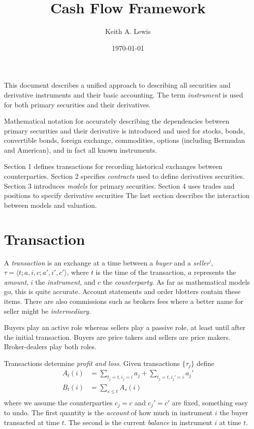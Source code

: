 \documentclass[12pt,letterpaper,fleqn]{report}
\title{Cash Flow Framework}
\author{Keith A. Lewis}
\date{\today}
\begin{document}
\maketitle
This document describes a unified approach to describing all securities and
derivative instruments and their basic accounting. The term {\em instrument}
is used for both primary securities and their derivatives.

Mathematical notation for accurately describing the dependencies between
primary securities and their derivative is introduced and used for stocks, bonds, convertible
bonds, foreign exchange, commodities, options (including Bermudan and American),
and in fact all known instruments.

Section 1 defines transactions for recording historical exchanges between counterparties. 
Section 2 specifies {\em contracts} used to define derivatives securities. 
Section 3 introduces {\em models} for primary securities. 
Section 4 uses trades and positions to specify derivative securities
The last section describes
the interaction between models and valuation.

\section{Transaction}
A {\em transaction} is an exchange at a time between a {\em buyer}
and a {\em seller}',
\(\tau = \langle t;a,i,c;a',i',c'\rangle\),
where \(t\) is the time of the transaction,
\(a\) represents the {\em amount}, 
\(i\) the {\em instrument}, 
and \(c\) the {\em counterparty}. 
As far as mathematical models go, this is
quite accurate. Account statements and order blotters contain these items.
There are also commissions such as brokers fees where a better name for
seller might be {\em intermediary}.

Buyers play an active role whereas sellers play a passive role, at least
until after the initial transaction. Buyers are price takers and sellers
are price makers. Broker-dealers play both roles.

Transactions determine {\em profit and loss}. Given
transactions \(\{\tau_j\}\) define
\begin{align*}
A_t(i) &= \sum_{t_j = t, i_j = i} a_j
+ \sum_{t_j = t, i_j' = i} a_j'\\
B_t(i) &= \sum_{s \le t} A_s(i)\\
\end{align*}
where we assume the counterparties \(c_j = c\) and \(c_j' = c'\) are fixed,
something easy to undo.
The first quantity is the {\em account} of how much in instrument \(i\)
the buyer transacted at time \(t\). The second is the current {\em balance}
in instrument \(i\) at time \(t\).
\end{document}
